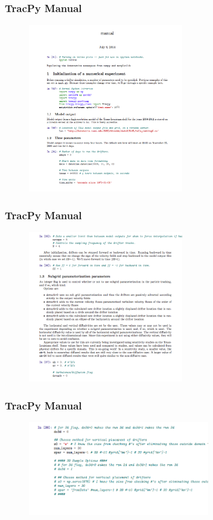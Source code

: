 \documentclass[ignorenonframetext]{beamer}
\begin{document}
\begin{frame}[t]\frametitle{TracPy Manual}
	\begin{figure}[htbp]
		\centering
		\includegraphics[width=0.6\textwidth]{figures/manual1}
	\end{figure}
\end{frame}
\begin{frame}[t,noframenumbering]\frametitle{TracPy Manual}
	\begin{figure}[htbp]
		\centering
		\includegraphics[width=0.6\textwidth]{figures/manual2}
	\end{figure}
\end{frame}
\begin{frame}[t,noframenumbering]\frametitle{TracPy Manual}
	\begin{figure}[htbp]
		\centering
		\includegraphics[width=0.7\textwidth]{figures/manual3}
	\end{figure}
\end{frame}
\end{document}
